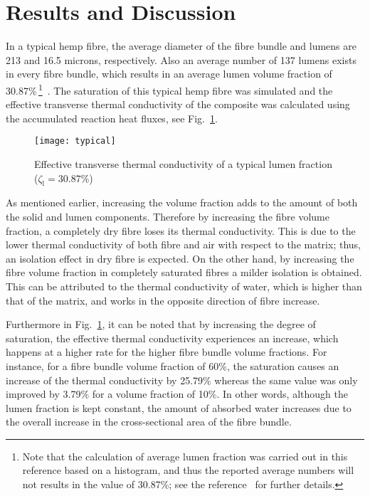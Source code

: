 \section{Results and Discussion}
	In a typical hemp fibre, the average diameter of the fibre bundle and lumens are 213 and 16.5 microns, respectively. Also an average number of 137 lumens exists in every fibre bundle, which results in an average lumen volume fraction of 30.87\%\,\footnote{\red Note that the calculation of average lumen fraction was carried out in this reference based on a histogram, and thus the reported average numbers will not results in the value of 30.87\%; see the reference~\autocite{Liu.2011} for further details.\bl}~\autocite{Liu.2011}. The saturation of this typical hemp fibre was simulated and the effective transverse thermal conductivity of the composite was calculated using the accumulated reaction heat fluxes, see Fig.~\ref{fig:typical}.
	
\begin{figure}[!h]
  \centering
\texttt{[image: typical]}
  \caption{Effective transverse thermal conductivity of a typical lumen fraction ($\zeta_{\text{l}}=30.87\%$)}
  \label{fig:typical}
\end{figure}

	\red 
	As mentioned earlier, increasing the volume fraction adds to the amount of both the solid and lumen components. Therefore by increasing the fibre volume fraction, a completely dry fibre loses its thermal conductivity. This is due to the lower thermal conductivity of both fibre and air with respect to the matrix; thus, an isolation effect in dry fibre is expected. On the other hand, by increasing the fibre volume fraction in completely saturated fibres a milder isolation is obtained. This can be attributed to the thermal conductivity of water, which is higher than that of the matrix, and works in the opposite direction of fibre increase.\bl


	Furthermore in Fig.~\ref{fig:typical}, it can be noted that by increasing the degree of saturation, the effective thermal conductivity experiences an increase, which happens at a higher rate for the higher fibre bundle volume fractions. For instance, for a fibre bundle volume fraction of 60\%, the saturation causes an increase of the thermal conductivity by 25.79\% whereas the same value was only improved by 3.79\% for a volume fraction of 10\%. In other words, although the lumen fraction is kept constant, the amount of absorbed water increases due to the overall increase in the cross-sectional area of the fibre bundle.
	

